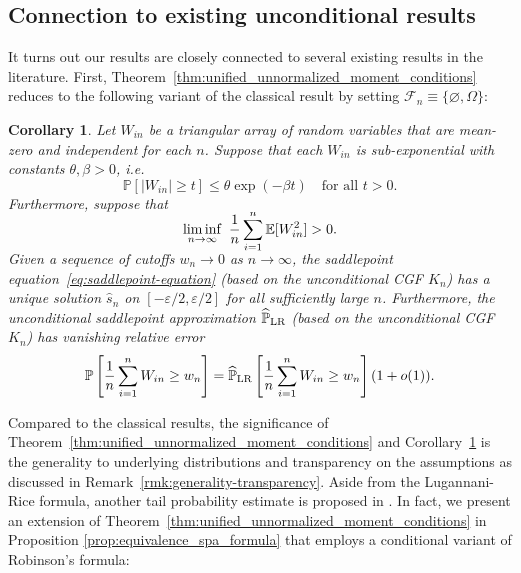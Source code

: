 \documentclass[12pt]{article}
\newtheorem{corollary}{Corollary}
\theoremstyle{definition}
\def\P{\mathbb{P}}
\def\P{\mathbb{P}}
\newcommand{\E}{\mathbb E}								%
\renewcommand{\P}{\mathbb{P}}							%
\begin{document}
  \subsection{Connection to existing unconditional results}\label{sec:connection-spa-literatures}
  
  It turns out our results are closely connected to several existing results in the literature. First, Theorem~\ref{thm:unified_unnormalized_moment_conditions} reduces to the following variant of the classical \citet{Lugannani1980} result by setting $\mathcal{F}_n \equiv \{\varnothing,\Omega\}$:
  
  \begin{corollary}\label{cor:unconditional_LR_formula}
	  Let $W_{in}$ be a triangular array of random variables that are mean-zero and independent for each $n$. Suppose that each $W_{in}$ is sub-exponential with constants $\theta, \beta > 0$, i.e. 
	  \begin{equation} \label{eq:subexponential}
	  \P[|W_{in}| \geq t] \leq \theta \exp(-\beta t) \quad \text{for all } t > 0.
	  \end{equation} 
	  Furthermore, suppose that
	  \begin{align}  \label{eq:nondegeneracy-unconditional}
	  \smash{\liminf_{n \rightarrow \infty}\ \frac{1}{n}\sum_{i = 1}^n \E[W_{in}^2] > 0.}
	  \end{align}
	  Given a sequence of cutoffs $w_n \rightarrow 0$ as $n \rightarrow \infty$, the saddlepoint equation~\eqref{eq:saddlepoint-equation} (based on the unconditional CGF $K_n$) has a unique solution $\hat s_n$ on $[-\varepsilon/2, \varepsilon/2]$ for all sufficiently large $n$. Furthermore, the unconditional saddlepoint approximation $\widehat{\P}_{\textnormal{LR}}$ (based on the unconditional CGF $K_n$) has vanishing relative error
	  \begin{align} \label{eq:conclusion_unconditional_saddlepoint_approximation}
	  \P\left[\frac{1}{n}\sum_{i = 1}^n W_{in} \geq w_n\right] = \widehat{\P}_{\textnormal{LR}}\left[\frac{1}{n}\sum_{i = 1}^n W_{in} \geq w_n\right](1+o(1)).
	  \end{align}
  \end{corollary}
  Compared to the classical results, the significance of Theorem~\ref{thm:unified_unnormalized_moment_conditions} and Corollary~\ref{cor:unconditional_LR_formula} is the generality to underlying distributions and transparency on the assumptions as discussed in Remark~\ref{rmk:generality-transparency}. Aside from the Lugannani-Rice formula, another tail probability estimate is proposed in \cite{Robinson1982}. In fact, we present an extension of Theorem~\ref{thm:unified_unnormalized_moment_conditions} in Proposition \ref{prop:equivalence_spa_formula} that employs a conditional variant of Robinson's formula:
\end{document}
